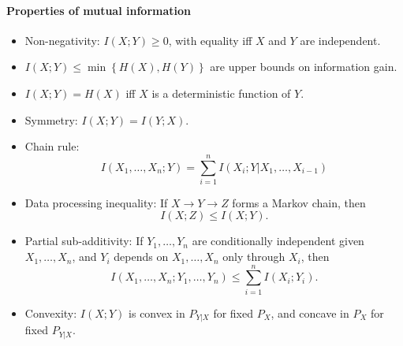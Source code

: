 \paragraph{Properties of mutual information}
\begin{itemize}
  \item \textcolor{Bittersweet}{Non-negativity}: $I(X;Y)\ge 0$, with equality
    iff $X$ and $Y$ are independent.
  \item $I(X;Y)\le \min{\left\{ H(X), H(Y) \right\} }$ are
    \textcolor{Bittersweet}{upper bounds} on information gain.
  \item $I(X;Y)=H(X)$ iff $X$ is a \textcolor{Bittersweet}{deterministic}
    function of $Y$.
  \item \textcolor{Bittersweet}{Symmetry}: $I(X;Y)=I(Y;X)$.
  \item \textcolor{Bittersweet}{Chain rule}:
    \[I(X_1,\ldots,X_{n};Y)=\sum_{i=1}^{n} I(X_i;Y|X_1,\ldots,X_{i-1})\]
  \item \textcolor{Bittersweet}{Data processing inequality}: If $X\to Y\to Z$ 
    forms a Markov chain, then
    \[I(X;Z)\le I(X;Y).\]
  \item \textcolor{Bittersweet}{Partial sub-additivity}: If $Y_1,\ldots,Y_{n}$
    are conditionally independent given $X_1,\ldots,X_{n}$, and $Y_i$ depends
    on $X_1,\ldots,X_{n}$ only through $X_i$, then
    \[I(X_1,\ldots,X_{n};Y_1,\ldots,Y_{n})\le \sum_{i=1}^{n} I(X_i;Y_i).\]
  \item \textcolor{Bittersweet}{Convexity}: $I(X;Y)$ is convex in $P_{Y|X}$ for fixed
    $P_X$, and concave in $P_X$ for fixed $P_{Y|X}$.
\end{itemize}
